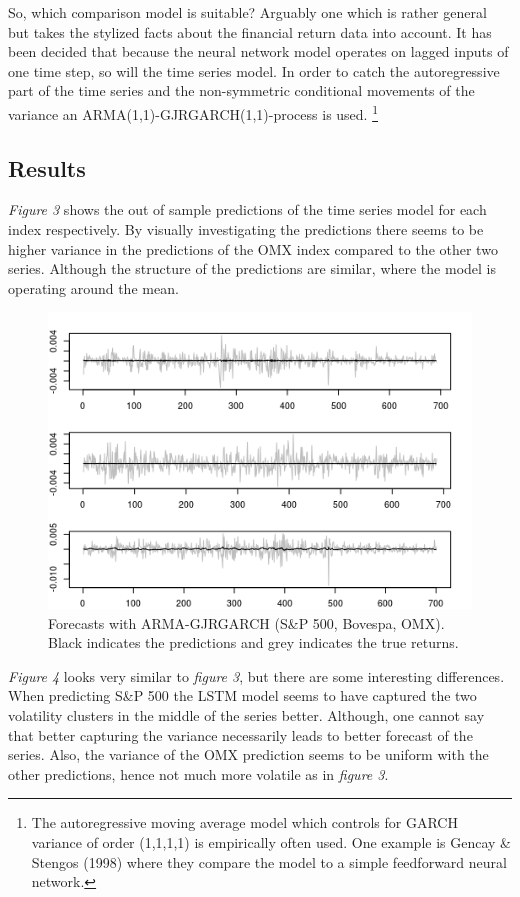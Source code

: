\documentclass[12pt, letterpaper]{amsart}%
\begin{document}
So, which comparison model is suitable? Arguably one which is rather general but takes the stylized facts about the financial return data into account. It has been decided that because the neural network model operates on lagged inputs of one time step, so will the time series model. In order to catch the autoregressive part of the time series and the non-symmetric conditional movements of the variance an ARMA(1,1)-GJRGARCH(1,1)-process is used. \footnote{The autoregressive moving average model which controls for GARCH variance of order (1,1,1,1) is empirically often used. One example is Gencay \& Stengos (1998) where they compare the model to a simple feedforward neural network.}

\subsection{Results}
\textit{Figure 3} shows the out of sample predictions of the time series model for each index respectively. By visually investigating the predictions there seems to be higher variance in the predictions of the OMX index compared to the other two series. Although the structure of the predictions are similar, where the model is operating around the mean.
\\

\begin{figure}%
\caption{Forecasts with ARMA-GJRGARCH (S\&P 500, Bovespa, OMX). Black indicates the predictions and grey indicates the true returns.}
\centering
\includegraphics[scale=1]{garch_pred2.png}
\end{figure}

\textit{Figure 4} looks very similar to \textit{figure 3}, but there are some interesting differences. When predicting S\&P 500 the LSTM model seems to have captured the two volatility clusters in the middle of the series better. Although, one cannot say that better capturing the variance necessarily leads to better forecast of the series. Also, the variance of the OMX prediction seems to be uniform with the other predictions, hence not much more volatile as in \textit{figure 3}.
\\
\end{document}
